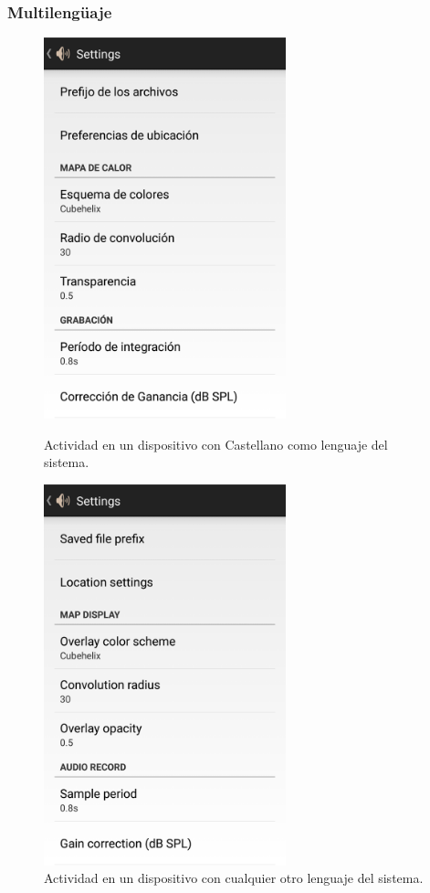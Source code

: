 \subsubsection{Multilengüaje}
\begin{figure}[h] \centering
 \begin{minipage}{0.45\textwidth}\centering
    \includegraphics[width=7cm]{graphs/settings.png} \caption{Actividad  en un dispositivo con Castellano como lenguaje del sistema.}\label{fig:screen:settings_es}
 \end{minipage}
 \hfill
\begin{minipage}{0.45\textwidth}\centering
    \includegraphics[width=7cm]{graphs/settings_en.png} \caption{Actividad  en un dispositivo con cualquier otro lenguaje del sistema.}\label{fig:screen:settings_en}
\end{minipage}
\end{figure}
